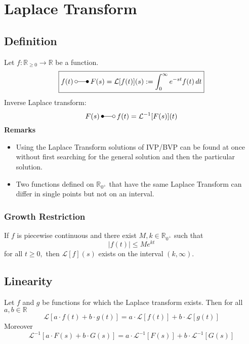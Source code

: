 \section{Laplace Transform}
\subsection{Definition}
Let $f:\mathbb{R}_{\geq 0} \rightarrow \mathbb{R}$ be a function.
\begin{equation*}
    \boxed{
    f(t)\:\laplace\:F(s)=\mathcal{L}[f(t)](s):=\int_{0}^{\infty}e^{-st}f(t)\,dt
    }
\end{equation*}
Inverse Laplace transform:
\begin{equation*}
    F(s)\:\Laplace\:f(t)=\mathcal{L}^{-1}[F(s)](t)
\end{equation*}
\textbf{Remarks} 
\begin{itemize}
    \item Using the Laplace Transform solutions of IVP/BVP can be found at once without first searching for the general solution and then the particular solution. 
    \item Two functions defined on $\mathbb{R}_{0^+}$ that have the same Laplace Transform can differ in single points but not on an interval.
\end{itemize}

\subsubsection{Growth Restriction}
If $f$ is piecewise continuous and there exist $M, k\in \mathbb{R}_{0^+}$ such that 
\begin{equation*}
    \left|f(t)\right|\leq Me^{kt}
\end{equation*}
for all $t\geq 0, $ then $\mathcal{L}[f](s) $ exists on the interval $(k,\infty).$


\subsection{Linearity}
Let $f$ and $g$ be functions for which the Laplace transform exists. Then for all $a,b \in \mathbb{R}$
\begin{equation*}
    \mathcal{L}[a\cdot f(t)+b\cdot g(t)] = a\cdot\mathcal{L}[f(t)]+b\cdot\mathcal{L}[g(t)]
\end{equation*}
Moreover
\begin{equation*}
    \mathcal{L}^{-1}[a\cdot F(s)+b\cdot G(s)] = a\cdot\mathcal{L}^{-1}[F(s)]+b\cdot\mathcal{L}^{-1}[G(s)]
\end{equation*}


